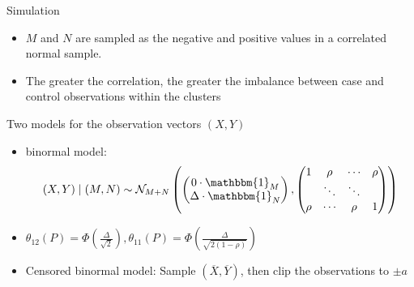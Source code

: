\documentclass{beamer}
\newcommand{\cind}{\perp \!\!\! \perp}
\newcommand{\aucindiv}{\theta_{11}}%
\newcommand{\aucpop}{\theta_{12}}%
\begin{document}
\begin{frame}
  Simulation


  \begin{itemize}
  \item $M$ and $N$ are sampled as the negative and positive values in a correlated normal sample.
  \item The greater the correlation, the greater the imbalance between
    case and control observations within the clusters
  \end{itemize}
\end{frame}
\begin{frame}
  Two models for the observation vectors $(X,Y)$
  \begin{itemize}
  \item binormal model:
    \begin{align}
  (X,Y) \mid (M,N) \sim \mathcal{N}_{M+N}\left(
    \begin{pmatrix}0\cdot\mathbbm{1}_M\\ \Delta\cdot\mathbbm{1}_N\end{pmatrix},
            \begin{pmatrix} 1 & \rho & \cdots & \rho\\
              &\ddots &\ddots\\
              \rho & \cdots & \rho &1
            \end{pmatrix}
            \right)
\end{align}
\item   $\aucpop(P) = \Phi\left(\frac{\Delta}{\sqrt{2}}\right), \aucindiv(P) =  \Phi\left(\frac{\Delta}{\sqrt{2(1-\rho)}}\right)$
\item Censored binormal model: Sample $(\overline X,\overline Y)$, then clip the observations to $\pm a$


\end{itemize}
\end{frame}
\end{document}
